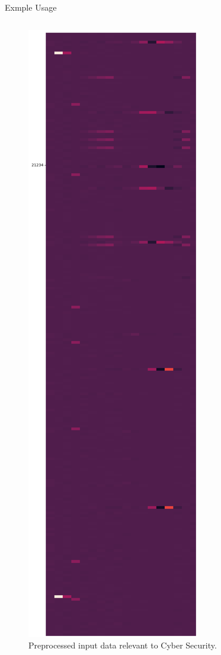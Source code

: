 \begin{frame}{Exmple Usage}
\begin{columns}
\begin{column}{.33\textwidth}
\begin{figure}
                \includegraphics[height=.7\textheight]{../Images/model_pipeline_tikz/CyberPred/raw_data.pdf} 
            \caption{Preprocessed input data relevant to Cyber Security.}       
            \end{figure}
            \ec
        \end{column}
    \end{columns}
\end{frame}


